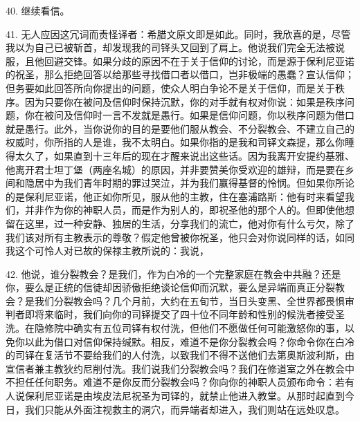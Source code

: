 40. 继续看信。\par

41. 无人应因这冗词而责怪译者：希腊文原文即是如此。同时，我欣喜的是，尽管我以为自己已被斩首，却发现我的司铎头又回到了肩上。他说我们完全无法被说服，且他回避交锋。如果分歧的原因不在于关于信仰的讨论，而是源于保利尼亚诺的祝圣，那么拒绝回答以给那些寻找借口者以借口，岂非极端的愚蠢？宣认信仰；但务要如此回答所向你提出的问题，使众人明白争论不是关于信仰，而是关于秩序。因为只要你在被问及信仰时保持沉默，你的对手就有权对你说：如果是秩序问题，你在被问及信仰时一言不发就是愚行。如果是信仰问题，你以秩序问题为借口就是愚行。此外，当你说你的目的是要他们服从教会、不分裂教会、不建立自己的权威时，你所指的人是谁，我不太明白。如果你指的是我和司铎文森提，那么你睡得太久了，如果直到十三年后的现在才醒来说出这些话。因为我离开安提约基雅、他离开君士坦丁堡（两座名城）的原因，并非要赞美你受欢迎的雄辩，而是要在乡间和隐居中为我们青年时期的罪过哭泣，并为我们赢得基督的怜悯。但如果你所论的是保利尼亚诺，他正如你所见，服从他的主教，住在塞浦路斯：他有时来看望我们，并非作为你的神职人员，而是作为别人的，即祝圣他的那个人的。但即使他想留在这里，过一种安静、独居的生活，分享我们的流亡，他对你有什么亏欠，除了我们该对所有主教表示的尊敬？假定他曾被你祝圣，他只会对你说同样的话，如同我这个可怜人对已故的保禄主教所说的：我说，\par

42. 他说，谁分裂教会？是我们，作为白冷的一个完整家庭在教会中共融？还是你，要么是正统的信徒却因骄傲拒绝谈论信仰而沉默，要么是异端而真正分裂教会？是我们分裂教会吗？几个月前，大约在五旬节，当日头变黑、全世界都畏惧审判者即将来临时，我们向你的司铎提交了四十位不同年龄和性别的候洗者接受圣洗。在隐修院中确实有五位司铎有权付洗，但他们不愿做任何可能激怒你的事，以免你以此为借口对信仰保持缄默。相反，难道不是你分裂教会吗？你命令你在白冷的司铎在复活节不要给我们的人付洗，以致我们不得不送他们去第奥斯波利斯，由宣信者兼主教狄约尼削付洗。我们说我们分裂教会吗？我们在修道室之外在教会中不担任任何职务。难道不是你反而分裂教会吗？你向你的神职人员颁布命令：若有人说保利尼亚诺是由埃皮法尼祝圣为司铎的，就禁止他进入教堂。从那时起直到今日，我们只能从外面注视救主的洞穴，而异端者却进入，我们则站在远处叹息。\par

